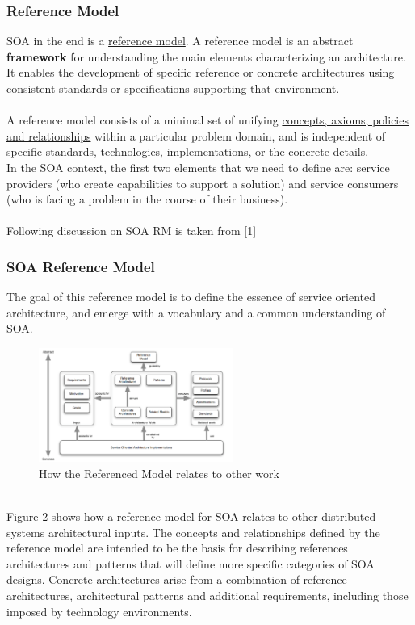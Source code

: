 \documentclass[10pt,a4paper]{article}
\begin{document}
\subsubsection{Reference Model}
SOA in the end is a \uline{reference model}. A reference model is an abstract \textbf{framework} for understanding the main elements characterizing an architecture. It enables the development of specific reference or concrete architectures using consistent standards or specifications supporting that environment. \\ \\ A reference model consists of a minimal set of unifying \uline{concepts, axioms, policies and relationships} within a particular problem domain, and is independent of specific standards, technologies, implementations, or the concrete details.\\
In the SOA context, the first two elements that we need to define are: service providers (who create capabilities to support a solution) and service consumers (who is facing a problem in the course of their business). \\ \\
Following discussion on SOA RM is taken from [1]
\subsubsection{SOA Reference Model}
The goal of this reference model is to define the essence of service oriented architecture, and emerge with a vocabulary and a common understanding of SOA. 
\begin{figure}[h!]
 \hfill \includegraphics[width=180pt]{images/soa-rm}\hspace*{\fill}
  \caption{How the Referenced Model relates to other work}
  \label{fig:soa-rm}
\end{figure}  \\
Figure 2 shows how a reference model for SOA relates to other distributed systems architectural inputs. The concepts and relationships defined by the reference model are intended to be the basis for describing references architectures and patterns that will define more specific categories of SOA designs. Concrete architectures arise from a combination of reference architectures, architectural patterns and additional requirements, including those imposed by technology environments.
\end{document}

